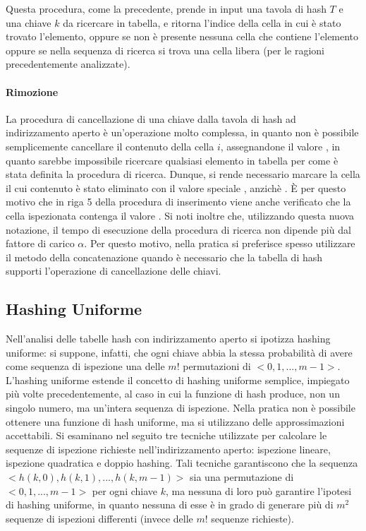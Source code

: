 

Questa procedura, come la precedente, prende in input una tavola di hash \(T\) e una chiave \(k\) da ricercare in tabella, e ritorna l'indice della cella in cui è stato trovato l'elemento, oppure  se non è presente nessuna cella che contiene l'elemento oppure se nella sequenza di ricerca si trova una cella libera (per le ragioni precedentemente analizzate).

\paragraph{Rimozione}
La procedura di cancellazione di una chiave dalla tavola di hash ad indirizzamento aperto è un'operazione molto complessa, in quanto non è possibile semplicemente cancellare il contenuto della cella \(i\), assegnandone il valore , in quanto sarebbe impossibile ricercare qualsiasi elemento in tabella per come è stata definita la procedura di ricerca. Dunque, si rende necessario marcare la cella il cui contenuto è stato eliminato con il valore speciale , anzichè . È per questo motivo che in riga 5 della procedura di inserimento viene anche verificato che la cella ispezionata contenga il valore . Si noti inoltre che, utilizzando questa nuova notazione, il tempo di esecuzione della procedura di ricerca non dipende più dal fattore di carico \(\alpha\). Per questo motivo, nella pratica si preferisce spesso utilizzare il metodo della concatenazione quando è necessario che la tabella di hash supporti l'operazione di cancellazione delle chiavi. 

\subsection{Hashing Uniforme}
Nell'analisi delle tabelle hash con indirizzamento aperto si ipotizza hashing uniforme: si suppone, infatti, che ogni chiave abbia la stessa probabilità di avere come sequenza di ispezione una delle \(m!\) permutazioni di \(<0,1,...,m-1>\). L'hashing uniforme estende il concetto di hashing uniforme semplice, impiegato più volte precedentemente, al caso in cui la funzione di hash produce, non un singolo numero, ma un'intera sequenza di ispezione. Nella pratica non è possibile ottenere una funzione di hash uniforme, ma si utilizzano delle approssimazioni accettabili. Si esaminano nel seguito tre tecniche utilizzate per calcolare le sequenze di ispezione richieste nell'indirizzamento aperto: ispezione lineare, ispezione quadratica e doppio hashing. Tali tecniche garantiscono che la sequenza \(<h(k,0), h(k,1),..., h(k,m-1)>\) sia una permutazione di \(<0,1,...,m-1>\) per ogni chiave \(k\), ma nessuna di loro può garantire l'ipotesi di hashing uniforme, in quanto nessuna di esse è in grado di generare più di \(m^2\) sequenze di ispezioni differenti (invece delle \(m!\) sequenze richieste). 

